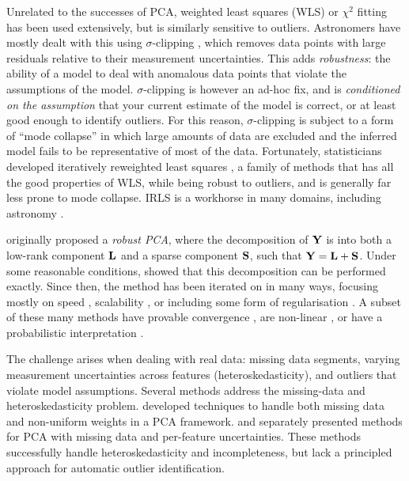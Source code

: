 \documentclass[onecolumn,floatfix,linenumbers,trackchanges]{aastex631}
\begin{document}
Unrelated to the successes of PCA, weighted least squares (WLS) or $\chi^2$ fitting \citep{legendre1805} has been used extensively, but is similarly sensitive to outliers.
Astronomers have mostly dealt with this using $\sigma$-clipping \citep{hoaglin1983}, which removes data points with large residuals relative to their measurement uncertainties.
This adds \emph{robustness}: the ability of a model to deal with anomalous data points that violate the assumptions of the model.
$\sigma$-clipping is however an ad-hoc fix, and is \emph{conditioned on the assumption} that your current estimate of the model is correct, or at least good enough to identify outliers. For this reason, $\sigma$-clipping is subject to a form of ``mode collapse'' in which large amounts of data are excluded and the inferred model fails to be representative of most of the data.
Fortunately, statisticians developed iteratively reweighted least squares \citep[IRLS;][]{holland1977}, a family of methods that has all the good properties of WLS, while being robust to outliers, and is generally far less prone to mode collapse. IRLS is a workhorse in many domains, including astronomy \citep[e.g.][]{magnier2020}.

\citet{candes2011} originally proposed a \emph{robust PCA}, where the decomposition of ${\bf Y}$ is into both a low-rank component ${\bf L}$ and a sparse component ${\bf S}$, such that ${\bf Y} = {\bf L} + {\bf S}$.
Under some reasonable conditions, \citet{candes2011} showed that this decomposition can be performed exactly.
Since then, the method has been iterated on in many ways, focusing mostly on speed \citep{lin2010}, scalability \citep{rodriguez2013, halko2011}, or including some form of regularisation \citep{guyon2012, wohlberg2012}.
A subset of these many methods have provable convergence \citep{netrapalli2014}, are non-linear \citep{scholkopf1998, wohlberg2012}, or have a probabilistic interpretation \citep{tipping1999}.

The challenge arises when dealing with real data: missing data segments, varying measurement uncertainties across features (heteroskedasticity), and outliers that violate model assumptions. Several methods address the missing-data and heteroskedasticity problem. \citet{budavari2009} developed techniques to handle both missing data and non-uniform weights in a PCA framework. \citet{bailey2012} and \citet{delchambre2015} separately presented methods for PCA with missing data and per-feature uncertainties. These methods successfully handle heteroskedasticity and incompleteness, but lack a principled approach for automatic outlier identification.
\end{document}

